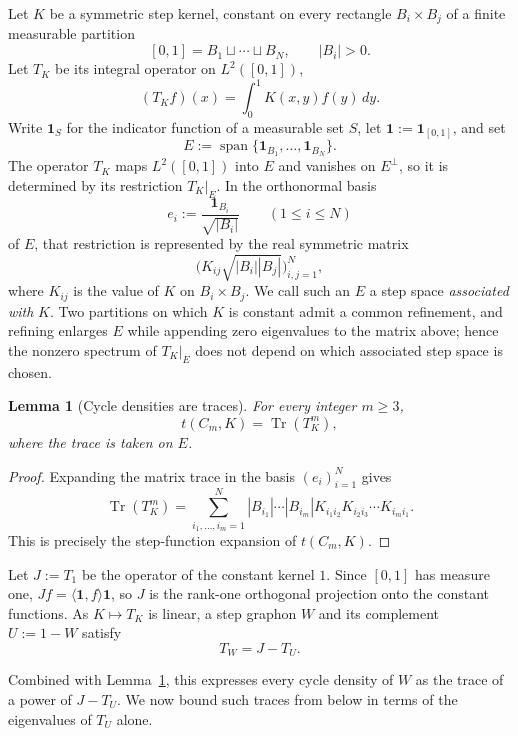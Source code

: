\documentclass[11pt]{article}
\newtheorem{lemma}[theorem]{Lemma}
\theoremstyle{definition}
\theoremstyle{remark}
\newcommand{\one}{\mathbf{1}}
\newcommand{\tr}{\operatorname{Tr}}
\begin{document}
Let $K$ be a symmetric step kernel, constant on every rectangle
$B_i\times B_j$ of a finite measurable partition
\[
  [0,1]=B_1\sqcup\cdots\sqcup B_N,
  \qquad |B_i|>0.
\]
Let $T_K$ be its integral operator on $L^2([0,1])$,
\[
  (T_Kf)(x)=\int_0^1K(x,y)f(y)\,dy.
\]
Write $\one_S$ for the indicator function of a measurable set $S$, let
$\one:=\one_{[0,1]}$, and set
\[
  E:=\operatorname{span}\{\one_{B_1},\ldots,\one_{B_N}\}.
\]
The operator $T_K$ maps $L^2([0,1])$ into $E$ and vanishes on $E^\perp$, so
it is determined by its restriction $T_K|_E$.  In the orthonormal basis
\[
  e_i:=\frac{\one_{B_i}}{\sqrt{|B_i|}}
  \qquad(1\le i\le N)
\]
of $E$, that restriction is represented by the real symmetric matrix
\[
  \bigl(K_{ij}\sqrt{|B_i||B_j|}\bigr)_{i,j=1}^N,
\]
where $K_{ij}$ is the value of $K$ on $B_i\times B_j$.  We call such an $E$ a
step space \emph{associated with} $K$.  Two partitions on which $K$ is
constant admit a common refinement, and refining enlarges $E$ while appending
zero eigenvalues to the matrix above; hence the nonzero spectrum of $T_K|_E$
does not depend on which associated step space is chosen.

\begin{lemma}[Cycle densities are traces]
  \label{lem:trace-density}
  For every integer $m\ge3$,
  \[
    t(C_m,K)=\tr(T_K^m),
  \]
  where the trace is taken on $E$.
\end{lemma}

\begin{proof}
  Expanding the matrix trace in the basis $(e_i)_{i=1}^N$ gives
  \[
    \tr(T_K^m)
    =
    \sum_{i_1,\ldots,i_m=1}^N
    |B_{i_1}|\cdots|B_{i_m}|
    K_{i_1i_2}K_{i_2i_3}\cdots K_{i_mi_1}.
  \]
  This is precisely the step-function expansion of $t(C_m,K)$.
\end{proof}

Let $J:=T_1$ be the operator of the constant kernel $1$.  Since $[0,1]$ has
measure one, $Jf=\langle\one,f\rangle\one$, so $J$ is the rank-one orthogonal
projection onto the constant functions.  As $K\mapsto T_K$ is linear, a step
graphon $W$ and its complement $U:=1-W$ satisfy
\begin{equation}
  T_W=J-T_U.
  \label{eq:operator-complement}
\end{equation}

Combined with Lemma~\ref{lem:trace-density}, this expresses every cycle
density of $W$ as the trace of a power of $J-T_U$.  We now bound such traces
from below in terms of the eigenvalues of $T_U$ alone.
\end{document}

